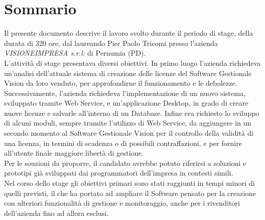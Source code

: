 
\cleardoublepage
{}
{}
\begingroup
\let\clearpage\relax
\let\cleardoublepage\relax
\let\cleardoublepage\relax

\chapter*{Sommario}

Il presente documento descrive il lavoro svolto durante il periodo di stage, della durata di 320 ore, dal laureando Pier Paolo Tricomi presso l'azienda \textit{VISIONEIMPRESA s.r.l.} di Pernumia (PD).
\\
L'attività di stage presentava diversi obiettivi. In primo luogo l'azienda richiedeva un'analisi dell'attuale sistema di creazione delle licenze del Software Gestionale Vision da loro venduto, per approfondirne il funzionamento e le debolezze. Successivamente, l'azienda richiedeva l'implementazione di un nuovo sistema, sviluppato tramite Web Service, e un'applicazione Desktop, in grado di creare nuove licenze e salvarle all'interno di un Database. Infine era richiesto lo sviluppo di alcuni moduli, sempre tramite l'utilizzo di Web Service, da aggiungere in un secondo momento al Software Gestionale Vision per il controllo della validità di una licenza, in termini di scadenza o di possibili contraffazioni, e per fornire all'utente finale maggiore libertà di gestione.\\
Per le souzioni da proporre, il candidato avrebbe potuto riferirsi a soluzioni e prototipi già sviluppati dai programmatori dell'impresa in contesti simili.
\\Nel corso dello stage gli obiettivi primari sono stati raggiunti in tempi minori di quelli previsti, il che ha portato ad ampliare il Software pensato per la creazione con ulteriori funzionalità di gestione e monitoraggio, anche per i rivenditori dell'azienda fino ad allora esclusi.
%
%

\endgroup			

\vfill

